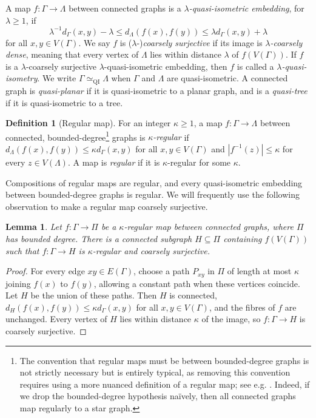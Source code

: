 \documentclass[10pt,a4paper]{amsart}
\newtheorem{lemma}[theorem]{Lemma}
\theoremstyle{definition}
\newtheorem{definition}[theorem]{Definition}
\begin{document}
A map $f:\Gamma\to \Lambda$ between connected graphs is a \emph{$\lambda$-quasi-isometric embedding}, for $\lambda\geq1$, if
\begin{equation}\label{eq:quasi-isometry-inequalities}
\lambda^{-1}d_\Gamma(x,y)-\lambda\leq d_\Lambda(f(x),f(y))\leq\lambda d_\Gamma(x,y)+\lambda
\end{equation}
for all $x,y\in V(\Gamma)$.
We say $f$ is ($\lambda$-)\emph{coarsely surjective} if its image is \emph{$\lambda$-coarsely dense}, meaning that every vertex of $\Lambda$ lies within distance $\lambda$ of $f(V(\Gamma))$. If $f$ is a $\lambda$-coarsely surjective $\lambda$-quasi-isometric embedding,  then $f$ is called a \emph{$\lambda$-quasi-isometry}.
We write $\Gamma\simeq_{\mathrm{QI}}\Lambda$ when $\Gamma$ and $\Lambda$ are quasi-isometric.
A connected graph is \emph{quasi-planar} if it is quasi-isometric to a planar graph, and is a \emph{quasi-tree} if it is quasi-isometric to a tree.


\begin{definition}[Regular map]\label{def:regular-map}
For an integer $\kappa\geq1$, a map $f:\Gamma\to\Lambda$ between connected, bounded-degree\footnote{The convention that regular maps must be between bounded-degree graphs is not strictly necessary but is entirely typical, as removing this convention requires using a more nuanced definition of a regular map; see e.g. \cite[Sec.~5.1]{hume2020poincare}. Indeed, if we drop the bounded-degree hypothesis na\"ively, then all connected graphs map regularly to a star graph.} 
graphs is \emph{$\kappa$-regular} if $d_\Lambda(f(x),f(y))\leq\kappa d_\Gamma(x,y)$ for all $x,y\in V(\Gamma)$ and $|f^{-1}(z)|\leq\kappa$ for every $z\in V(\Lambda)$.
A map is \emph{regular} if it is $\kappa$-regular for some $\kappa$.
\end{definition}

Compositions of regular maps are regular, and every quasi-isometric embedding between bounded-degree graphs is regular.
We will frequently use the following observation to make a regular map coarsely surjective.

\begin{lemma}\label{lem:regular-connected-image}
Let $f:\Gamma\to\Pi$ be a $\kappa$-regular map between connected graphs, where $\Pi$ has bounded degree.
There is a connected subgraph $H\subseteq\Pi$ containing $f(V(\Gamma))$ such that $f:\Gamma\to H$ is $\kappa$-regular and coarsely surjective.
\end{lemma}

\begin{proof}
For every edge $xy\in E(\Gamma)$, choose a path $P_{xy}$ in $\Pi$ of length at most $\kappa$ joining $f(x)$ to $f(y)$, allowing a constant path when these vertices coincide.
Let $H$ be the union of these paths.
Then $H$ is connected, $d_H(f(x),f(y))\leq \kappa d_\Gamma(x,y)$ for all $x,y\in V(\Gamma)$, and the fibres of $f$ are unchanged.
Every vertex of $H$ lies within distance $\kappa$ of the image, so $f:\Gamma\to H$ is coarsely surjective.
\end{proof}
\end{document}
